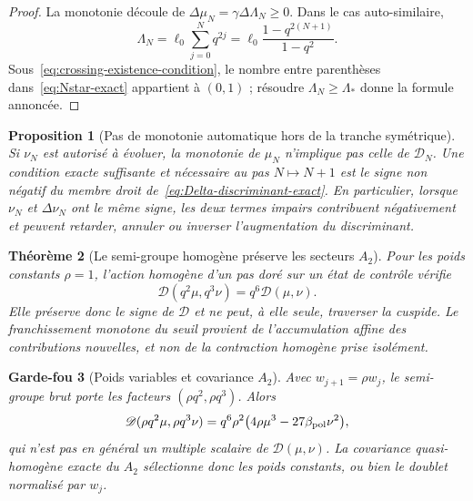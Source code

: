 \documentclass[11pt,a4paper]{article}
\newtheorem{theorem}{Théorème}[section]
\newtheorem{proposition}[theorem]{Proposition}
\newtheorem{guardrail}[theorem]{Garde-fou}
\begin{document}
\begin{proof}
La monotonie découle de $\Delta\mu_N=\gamma\Delta\Lambda_N\ge0$. Dans le cas auto-similaire,
\[
 \Lambda_N=\ell_0\sum_{j=0}^{N}q^{2j}
 =\ell_0\frac{1-q^{2(N+1)}}{1-q^2}.
\]
Sous~\eqref{eq:crossing-existence-condition}, le nombre entre parenthèses dans~\eqref{eq:Nstar-exact} appartient à $(0,1)$ ; résoudre $\Lambda_N\ge\Lambda_*$ donne la formule annoncée.
\end{proof}

\begin{proposition}[Pas de monotonie automatique hors de la tranche symétrique]\label{prop:offaxis-no-monotonicity}
Si $\nu_N$ est autorisé à évoluer, la monotonie de $\mu_N$ n'implique pas celle de $\mathscr D_N$. Une condition exacte suffisante et nécessaire au pas $N\mapsto N+1$ est le signe non négatif du membre droit de~\eqref{eq:Delta-discriminant-exact}. En particulier, lorsque $\nu_N$ et $\Delta\nu_N$ ont le même signe, les deux termes impairs contribuent négativement et peuvent retarder, annuler ou inverser l'augmentation du discriminant.
\end{proposition}

\begin{theorem}[Le semi-groupe homogène préserve les secteurs $A_2$]\label{thm:A2-semigroup-sign}
Pour les poids constants $\rho=1$, l'action homogène d'un pas doré sur un état de contrôle vérifie
\begin{equation}\label{eq:A2-one-step-covariance}
 \boxed{\mathscr D(q^2\mu,q^3\nu)=q^6\mathscr D(\mu,\nu).}
\end{equation}
Elle préserve donc le signe de $\mathscr D$ et ne peut, à elle seule, traverser la cuspide. Le franchissement monotone du seuil provient de l'\emph{accumulation affine} des contributions nouvelles, et non de la contraction homogène prise isolément.
\end{theorem}

\begin{guardrail}[Poids variables et covariance $A_2$]
Avec $w_{j+1}=\rho w_j$, le semi-groupe brut porte les facteurs $(\rho q^2,\rho q^3)$. Alors
\[
 \mathscr D(\rho q^2\mu,\rho q^3\nu)
 =q^6\rho^2\bigl(4\rho\mu^3-27\beta_{\rm pol}\nu^2\bigr),
\]
qui n'est pas en général un multiple scalaire de $\mathscr D(\mu,\nu)$. La covariance quasi-homogène exacte du $A_2$ sélectionne donc les poids constants, ou bien le doublet normalisé par $w_j$.
\end{guardrail}
\end{document}
